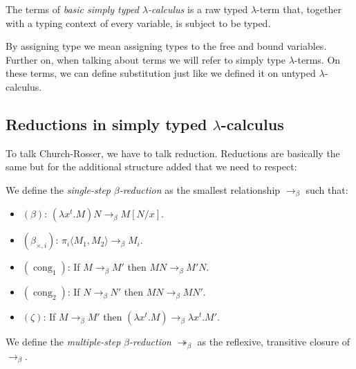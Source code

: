 \begin{definition}
  The terms of \emph{basic simply typed $\lambda$-calculus} is a raw typed $\lambda$-term that, together with a typing context of every variable, is subject to be typed.
\end{definition}

By assigning type we mean assigning types to the free and bound variables. Further on, when talking about terms we will refer to simply type $\lambda$-terms. On these terms, we can define substitution just like we defined it on untyped $\lambda$-calculus.


\subsection{Reductions in simply typed $\lambda$-calculus}

To talk Church-Rosser, we have to talk reduction. Reductions are basically the same but for the additional structure added that we need to respect: 

\begin{definition}
  We define the \emph{single-step} $\beta$\emph{-reduction} as the smallest relationship $\to_\beta$ such that:
\begin{itemize}
\item[]$(\beta)$: $ (\lambda x^t.M)N \to_\beta M[N/x]$.\\
\item[]$(\beta_{\times,i})$: $\pi_i\langle M_1,M_2\rangle \to_\beta M_i$.\\
\item[]$(\operatorname{cong}_1)$: If $ M \to_\beta M'$ then $MN \to_\beta M'N$.\\
\item[]$(\operatorname{cong}_2)$: If $ N \to_\beta N'$ then $ MN \to_\beta MN'$.\\
\item[]$(\zeta)$: If $M\to_\beta M'$ then $(\lambda x^t.M) \to_\beta \lambda x^t.M'$.\\
\end{itemize}
We define the \emph{multiple-step} $\beta$\emph{-reduction} $\twoheadrightarrow_\beta$ as the reflexive, transitive closure of $\to_\beta$.
\end{definition}

